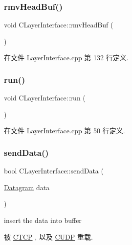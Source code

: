 \subsubsection{\texorpdfstring{rmv\+Head\+Buf()}{rmvHeadBuf()}}
{\footnotesize\ttfamily void C\+Layer\+Interface\+::rmv\+Head\+Buf (\begin{DoxyParamCaption}{ }\end{DoxyParamCaption})\hspace{0.3cm}{\ttfamily [protected]}}



在文件 Layer\+Interface.\+cpp 第 132 行定义.

\mbox{\label{class_c_layer_interface_a72740530fff12b29c8d1fb23aed88f2c}} 
\subsubsection{\texorpdfstring{run()}{run()}}
{\footnotesize\ttfamily void C\+Layer\+Interface\+::run (\begin{DoxyParamCaption}{ }\end{DoxyParamCaption})}



在文件 Layer\+Interface.\+cpp 第 50 行定义.

\mbox{\label{class_c_layer_interface_ae5115cf6ee0e76247dac067cc797a06b}} 
\subsubsection{\texorpdfstring{send\+Data()}{sendData()}}
{\footnotesize\ttfamily bool C\+Layer\+Interface\+::send\+Data (\begin{DoxyParamCaption}\item[{\hyperlink{class_datagram}{Datagram}}]{data }\end{DoxyParamCaption})\hspace{0.3cm}{\ttfamily [virtual]}}

insert the data into buffer 

被 \hyperlink{class_c_t_c_p_a4552b74145e832f32c1cb45a9fa2a5e9}{C\+T\+CP} , 以及 \hyperlink{class_c_u_d_p_a1f6e555ad4997b283e68ebfa7dc0d263}{C\+U\+DP} 重载.



